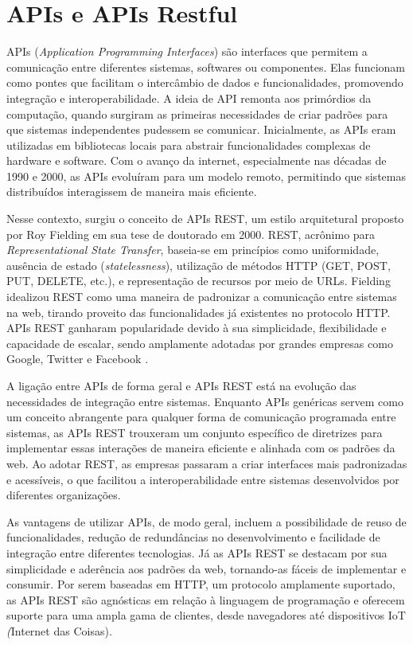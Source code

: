 \section{APIs e APIs Restful}

APIs (\textit{Application Programming Interfaces}) são interfaces que permitem a comunicação entre diferentes sistemas, softwares ou componentes. Elas funcionam como pontes que facilitam o intercâmbio de dados e funcionalidades, promovendo integração e interoperabilidade. A ideia de API remonta aos primórdios da computação, quando surgiram as primeiras necessidades de criar padrões para que sistemas independentes pudessem se comunicar. Inicialmente, as APIs eram utilizadas em bibliotecas locais para abstrair funcionalidades complexas de hardware e software. Com o avanço da internet, especialmente nas décadas de 1990 e 2000, as APIs evoluíram para um modelo remoto, permitindo que sistemas distribuídos interagissem de maneira mais eficiente.

Nesse contexto, surgiu o conceito de APIs REST, um estilo arquitetural proposto por Roy Fielding em sua tese de doutorado em 2000. \acrshort{REST}, acrônimo para \textit{Representational State Transfer}, baseia-se em princípios como uniformidade, ausência de estado (\textit{statelessness}), utilização de métodos \acrfull{HTTP} (GET, POST, PUT, DELETE, etc.), e representação de recursos por meio de \acrfull{URLs}. Fielding idealizou REST como uma maneira de padronizar a comunicação entre sistemas na web, tirando proveito das funcionalidades já existentes no protocolo \acrshort{HTTP}. APIs REST ganharam popularidade devido à sua simplicidade, flexibilidade e capacidade de escalar, sendo amplamente adotadas por grandes empresas como Google, Twitter e Facebook \cite{fielding2000}.

A ligação entre APIs de forma geral e APIs REST está na evolução das necessidades de integração entre sistemas. Enquanto APIs genéricas servem como um conceito abrangente para qualquer forma de comunicação programada entre sistemas, as APIs REST trouxeram um conjunto específico de diretrizes para implementar essas interações de maneira eficiente e alinhada com os padrões da web. Ao adotar REST, as empresas passaram a criar interfaces mais padronizadas e acessíveis, o que facilitou a interoperabilidade entre sistemas desenvolvidos por diferentes organizações.

As vantagens de utilizar APIs, de modo geral, incluem a possibilidade de reuso de funcionalidades, redução de redundâncias no desenvolvimento e facilidade de integração entre diferentes tecnologias. Já as APIs REST se destacam por sua simplicidade e aderência aos padrões da web, tornando-as fáceis de implementar e consumir. Por serem baseadas em HTTP, um protocolo amplamente suportado, as APIs REST são agnósticas em relação à linguagem de programação e oferecem suporte para uma ampla gama de clientes, desde navegadores até dispositivos \acrfull{IoT} \textit(Internet das Coisas).

